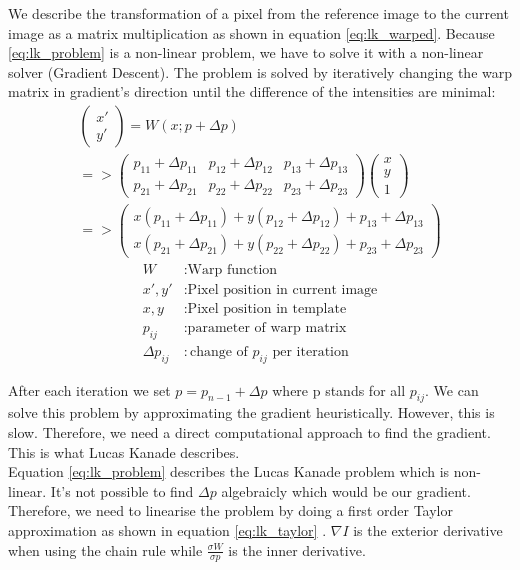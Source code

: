 \documentclass[11pt,a4paper,titlepage,oneside]{report}
\begin{document}
We describe the transformation of a pixel from the reference image to the current image as a matrix multiplication as shown in equation \ref{eq:lk_warped}. Because \ref{eq:lk_problem} is a non-linear problem, we have to solve it with a non-linear solver (Gradient Descent). The problem is solved by iteratively changing the warp matrix in gradient's direction until the difference of the intensities are minimal:
\begin{equation}\label{eq:lk_warped}
  \begin{gathered}
    \begin{pmatrix}
      x' \\
      y'
    \end{pmatrix}=
    W(x;p+\Delta p)\\
    =>
    \begin{pmatrix}
      p_{11}+\Delta p_{11} & p_{12}+\Delta p_{12} & p_{13}+\Delta p_{13} \\
      p_{21}+\Delta p_{21} & p_{22}+\Delta p_{22} & p_{23}+\Delta p_{23}
    \end{pmatrix}
    \begin{pmatrix}
      x\\
      y\\
      1
    \end{pmatrix}\\
    =>
    \begin{pmatrix}
      x(p_{11}+\Delta p_{11}) + y(p_{12}+\Delta p_{12}) + p_{13}+\Delta p_{13} \\
      x(p_{21}+\Delta p_{21}) + y(p_{22}+\Delta p_{22}) + p_{23}+\Delta p_{23}
    \end{pmatrix}
  \end{gathered}
\end{equation}
\begin{align*}
  W								&: \text{Warp function}\\
  x',y'           &: \text{Pixel position in current image}\\
  x,y             &: \text{Pixel position in template}\\
  p_{ij}          &: \text{parameter of warp matrix}\\
  \Delta p_{ij}   &: \text{change of $p_{ij}$ per iteration}
\end{align*}

After each iteration we set $p=p_{n-1}+\Delta p$ where p stands for all $p_{ij}$. We can solve this problem by approximating the gradient heuristically. However, this is slow. Therefore, we need a direct computational approach to find the gradient. This is what Lucas Kanade describes.\\
Equation \ref{eq:lk_problem} describes the Lucas Kanade problem which is non-linear. It's not possible to find $\Delta p$ algebraicly which would be our gradient. Therefore, we need to linearise the problem by doing a first order Taylor approximation as shown in equation \ref{eq:lk_taylor} \cite{taylor_series}. $\nabla I$ is the exterior derivative when using the chain rule while $\frac{\sigma W}{\sigma p}$ is the inner derivative. 
\end{document}
